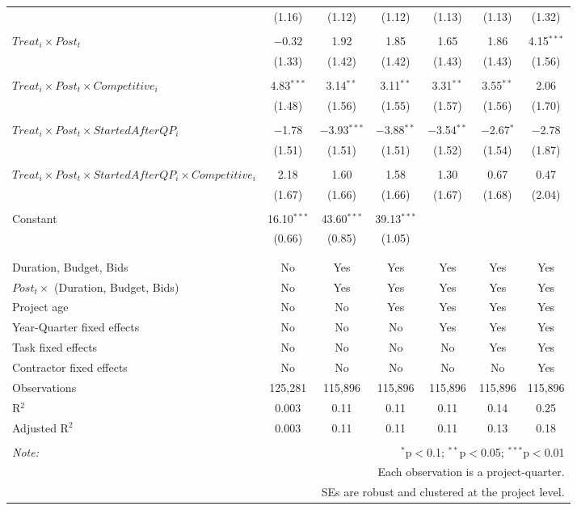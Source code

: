 \documentclass[
]{article}
\begin{document}
\begin{table}[H]
\begin{tabular}{@{\extracolsep{-3pt}}lcccccc}
  & (1.16) & (1.12) & (1.12) & (1.13) & (1.13) & (1.32) \\ 
  & & & & & & \\ 
 $Treat_i \times Post_t$ & $-$0.32 & 1.92 & 1.85 & 1.65 & 1.86 & 4.15$^{***}$ \\ 
  & (1.33) & (1.42) & (1.42) & (1.43) & (1.43) & (1.56) \\ 
  & & & & & & \\ 
 $Treat_i \times Post_t \times Competitive_i$ & 4.83$^{***}$ & 3.14$^{**}$ & 3.11$^{**}$ & 3.31$^{**}$ & 3.55$^{**}$ & 2.06 \\ 
  & (1.48) & (1.56) & (1.55) & (1.57) & (1.56) & (1.70) \\ 
  & & & & & & \\ 
 $Treat_i \times Post_t \times StartedAfterQP_i$ & $-$1.78 & $-$3.93$^{***}$ & $-$3.88$^{**}$ & $-$3.54$^{**}$ & $-$2.67$^{*}$ & $-$2.78 \\ 
  & (1.51) & (1.51) & (1.51) & (1.52) & (1.54) & (1.87) \\ 
  & & & & & & \\ 
 $Treat_i \times Post_t \times StartedAfterQP_i \times Competitive_i$ & 2.18 & 1.60 & 1.58 & 1.30 & 0.67 & 0.47 \\ 
  & (1.67) & (1.66) & (1.66) & (1.67) & (1.68) & (2.04) \\ 
  & & & & & & \\ 
 Constant & 16.10$^{***}$ & 43.60$^{***}$ & 39.13$^{***}$ &  &  &  \\ 
  & (0.66) & (0.85) & (1.05) &  &  &  \\ 
  & & & & & & \\ 
\hline \\[-1.8ex] 
Duration, Budget, Bids & No & Yes & Yes & Yes & Yes & Yes \\ 
$Post_t \times $  (Duration, Budget, Bids) & No & Yes & Yes & Yes & Yes & Yes \\ 
Project age & No & No & Yes & Yes & Yes & Yes \\ 
Year-Quarter fixed effects & No & No & No & Yes & Yes & Yes \\ 
Task fixed effects & No & No & No & No & Yes & Yes \\ 
Contractor fixed effects & No & No & No & No & No & Yes \\ 
Observations & 125,281 & 115,896 & 115,896 & 115,896 & 115,896 & 115,896 \\ 
R$^{2}$ & 0.003 & 0.11 & 0.11 & 0.11 & 0.14 & 0.25 \\ 
Adjusted R$^{2}$ & 0.003 & 0.11 & 0.11 & 0.11 & 0.13 & 0.18 \\ 
\hline 
\hline \\[-1.8ex] 
\textit{Note:}  & \multicolumn{6}{r}{$^{*}$p$<$0.1; $^{**}$p$<$0.05; $^{***}$p$<$0.01} \\ 
 & \multicolumn{6}{r}{Each observation is a project-quarter.} \\ 
 & \multicolumn{6}{r}{SEs are robust and clustered at the project level.} \\ 
\end{tabular} 
\end{table}
\end{document}
